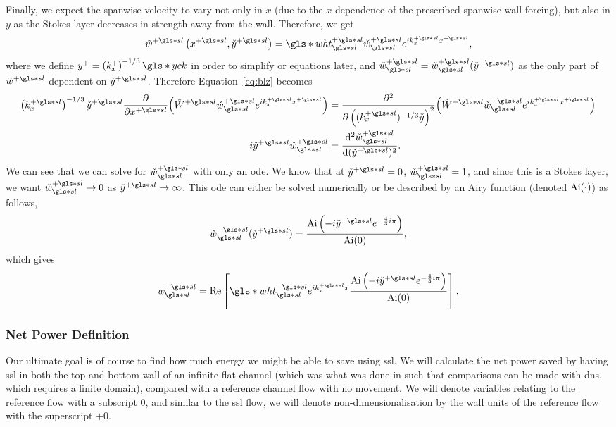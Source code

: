 Finally, we expect the spanwise velocity to vary not only in $x$ (due to the  $x$ dependence of the prescribed spanwise wall forcing), but also in  $y$ as the Stokes layer decreases in strength away from the wall. Therefore, we get
\begin{equation}
	\tilde{w}\ps\left(x\ps,\check{y}\ps\right)=\gls*{wht}\ps\ssl\check{w}\ssl\ps e^{ik\ps_x x\ps}\label{eq:wtlddef}
,\end{equation}
where we define $y^{+}=\left(k^{+}_x\right)^{-1 /3}\gls*{yck}$ in order to simplify or equations later, and $\check{w}\ssl \ps=\check{w}\ssl \ps(\check{y}\ps)$ as the only part of $\tilde{w}\ps$ dependent on $\check{y}\ps$.
Therefore Equation~\eqref{eq:blz} becomes
\begin{align}
	\left( k_x\ps \right) ^{-1 /3} \check{y}\ps \pdv{x\ps}(\hat{W}\ps \check{w}\ps\ssl e^{ik_x\ps x\ps})&= \pdv[2]{\left( (k_x\ps)^{-1 /3}\check{y} \right) }(\hat{W}\ps \check{w}\ps\ssl e^{ik_x\ps x\ps})\nonumber\\
	i \check{y}\ps \check{w}\ps\ssl &= \dv[2]{\check{w}\ps\ssl}{(\check{y}\ps)} 
.\end{align}
We can see that we can solve for $\check{w}\ps\ssl$ with only an \gls*{ode}. We know that at $\check{y}\ps=0$, $\check{w}\ps\ssl=1$, and since this is a Stokes layer, we want $\check{w}\ps\ssl \to 0$ as $\check{y}\ps\to \infty$. This \gls*{ode} can either be solved numerically or be described by an Airy function (denoted $\operatorname{Ai} (\cdot)$) as follows,
 \begin{equation}
	 \check{w}\ps\ssl(\check{y}\ps)= \frac{\Ai\left(-i \check{y}\ps e ^{-\frac{4}{3}i\pi}\right)}{\Ai(0)}\label{eq:wchecksoln}
,\end{equation}
which gives
\begin{equation}
	w\ps\ssl = \Re \left[ \gls*{wht}\ps\ssl e^{i k_{x}\ps x}\frac{\Ai\left(-i \check{y}\ps e ^{-\frac{4}{3}i\pi}\right)}{\Ai(0)}\right] 
.\end{equation}

\subsubsection{Net Power Definition}
Our ultimate goal is of course to find how much energy we might be able to save using \gls*{ssl}. We will calculate the net power saved by having \gls*{ssl} in both the top and bottom wall of an infinite flat channel (which was what was done in \textcite{viotti2009} such that comparisons can be made with \gls*{dns}, which requires a finite domain), compared with a reference channel flow with no movement. We will denote variables relating to the reference flow with a subscript 0, and similar to the \gls*{ssl} flow, we will denote non-dimensionalisation by the wall units of the reference flow with the superscript $+0$.

